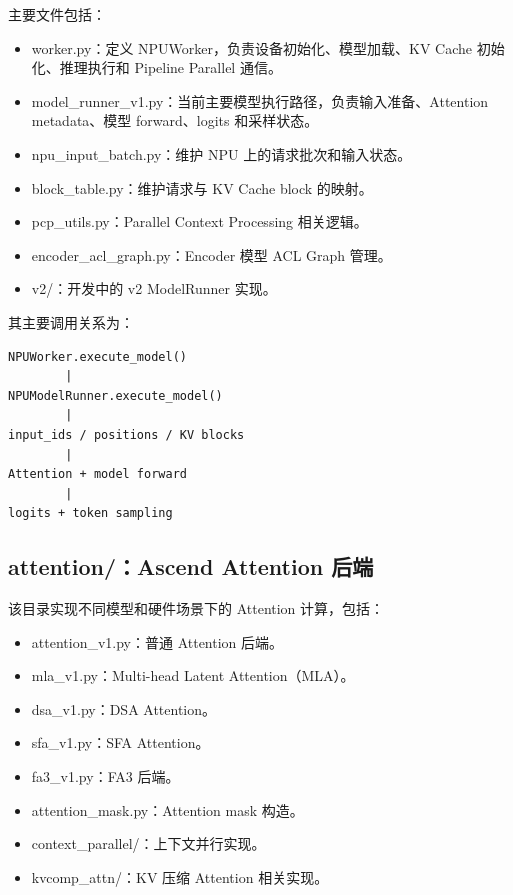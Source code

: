 \documentclass[UTF8,11pt,a4paper]{ctexart}
\DeclareRobustCommand{\folder}[1]{\texttt{\detokenize{#1}}}
\DeclareRobustCommand{\code}[1]{\texttt{\detokenize{#1}}}
\def\folder#1{#1}%
\def\code#1{#1}%
\begin{document}
主要文件包括：

\begin{itemize}
  \item \folder{worker.py}：定义 \code{NPUWorker}，负责设备初始化、模型加载、KV Cache 初始化、推理执行和 Pipeline Parallel 通信。
  \item \folder{model_runner_v1.py}：当前主要模型执行路径，负责输入准备、Attention metadata、模型 forward、logits 和采样状态。
  \item \folder{npu_input_batch.py}：维护 NPU 上的请求批次和输入状态。
  \item \folder{block_table.py}：维护请求与 KV Cache block 的映射。
  \item \folder{pcp_utils.py}：Parallel Context Processing 相关逻辑。
  \item \folder{encoder_acl_graph.py}：Encoder 模型 ACL Graph 管理。
  \item \folder{v2/}：开发中的 v2 ModelRunner 实现。
\end{itemize}

其主要调用关系为：

\begin{lstlisting}
NPUWorker.execute_model()
        |
NPUModelRunner.execute_model()
        |
input_ids / positions / KV blocks
        |
Attention + model forward
        |
logits + token sampling
\end{lstlisting}

\subsection{\folder{attention/}：Ascend Attention 后端}

该目录实现不同模型和硬件场景下的 Attention 计算，包括：

\begin{itemize}
  \item \folder{attention_v1.py}：普通 Attention 后端。
  \item \folder{mla_v1.py}：Multi-head Latent Attention（MLA）。
  \item \folder{dsa_v1.py}：DSA Attention。
  \item \folder{sfa_v1.py}：SFA Attention。
  \item \folder{fa3_v1.py}：FA3 后端。
  \item \folder{attention_mask.py}：Attention mask 构造。
  \item \folder{context_parallel/}：上下文并行实现。
  \item \folder{kvcomp_attn/}：KV 压缩 Attention 相关实现。
\end{itemize}
\end{document}
